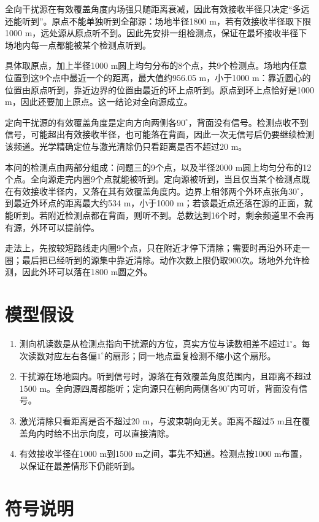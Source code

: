 \documentclass{cumcmthesis}
\begin{document}
全向干扰源在有效覆盖角度内场强只随距离衰减，因此有效接收半径只决定“多远还能听到”。原点不能单独听到全部源：场地半径1800 m，若有效接收半径取下限1000 m，远处源从原点听不到。因此先安排一组检测点，保证在最坏接收半径下场地内每一点都能被某个检测点听到。

具体取原点，加上半径1000 m圆上均匀分布的8个点，共9个检测点。场地内任意位置到这9个点中最近一个的距离，最大值约956.05 m，小于1000 m：靠近圆心的位置由原点听到，靠近边界的位置由最近的环上点听到。原点到环上点恰好是1000 m，因此还要加上原点。这一结论对全向源成立。

定向干扰源的有效覆盖角度是定向方向两侧各$90^\circ$，背面没有信号。检测点收不到信号，可能超出有效接收半径，也可能落在背面，因此一次无信号后仍要继续检测该频道。光学精确定位与激光清除仍只看距离是否不超过20 m。

本问的检测点由两部分组成：问题三的9个点，以及半径2000 m圆上均匀分布的12个点。全向源走完内圈9个点就能被听到。定向源被听到，当且仅当某个检测点既在有效接收半径内，又落在其有效覆盖角度内。边界上相邻两个外环点张角$30^\circ$，到最近外环点的距离最大约534 m，小于1000 m；若该最近点还落在源的正面，就能听到。若附近检测点都在背面，则听不到。总数达到16个时，剩余频道里不会再有源，外环可以提前停。

走法上，先按较短路线走内圈9个点，只在附近才停下清除；需要时再沿外环走一圈；最后把已经听到的源集中靠近清除。动作次数上限仍取900次。场地外允许检测，因此外环可以落在1800 m圆之外。

\section{模型假设}

\begin{enumerate}
\item 测向机读数是从检测点指向干扰源的方位，真实方位与读数相差不超过$1^\circ$。每次读数对应左右各偏$1^\circ$的扇形；同一地点重复检测不缩小这个扇形。
\item 干扰源在场地圆内。听到信号时，源落在有效覆盖角度范围内，且距离不超过1500 m。全向源四周都能听；定向源只在朝向两侧各$90^\circ$内可听，背面没有信号。
\item 激光清除只看距离是否不超过20 m，与波束朝向无关。距离不超过5 m且在覆盖角内时给不出示向度，可以直接清除。
\item 有效接收半径在1000 m到1500 m之间，事先不知道。检测点按1000 m布置，以保证在最差情形下仍能听到。
\end{enumerate}

\section{符号说明}
\end{document}
